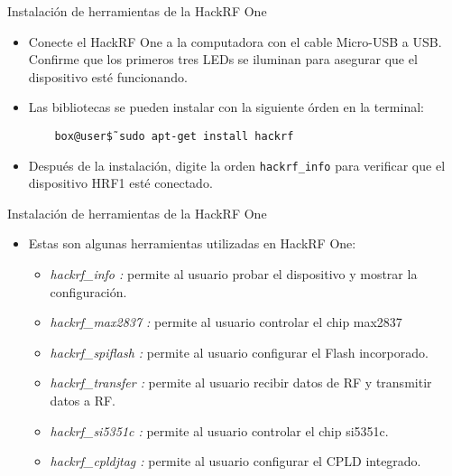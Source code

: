 \begin{frame}{Instalación de  herramientas de la HackRF One}

\begin{itemize}
    \item
    {Conecte el HackRF One a la computadora con el cable Micro-USB a USB. Confirme que los primeros tres  LEDs se iluminan para asegurar que el dispositivo esté funcionando.}
    \item
    Las bibliotecas se pueden instalar con la siguiente órden en la terminal:
    
    \begin{block}{}
    \texttt{
    ~~~box@user\~\$ sudo apt-get install hackrf}
    \end{block}
    
    \item
    {Después de la instalación, digite la orden {\tt hackrf\_info} para verificar que el dispositivo HRF1 esté conectado.}
    
\end{itemize}
\end{frame}

\begin{frame}{Instalación de  herramientas de la HackRF One}

\begin{itemize}
    \item
    {Estas son algunas herramientas utilizadas en HackRF One:
    \begin{itemize}
        \item  {\textit{hackrf\_info :} permite al usuario probar el dispositivo y mostrar la configuración.}
        \item  {\textit{hackrf\_max2837 :} permite al usuario controlar el chip max2837}
        \item  {\textit{hackrf\_spiflash :} permite al usuario configurar el Flash incorporado.}
        \item  {\textit{hackrf\_transfer :} permite al usuario recibir datos de RF y transmitir datos a RF.}
        \item  {\textit{hackrf\_si5351c :} permite al usuario controlar el chip si5351c.}
        \item  {\textit{hackrf\_cpldjtag :} permite al usuario configurar el CPLD integrado.}
    \end{itemize}
    }
\end{itemize}
\end{frame}

